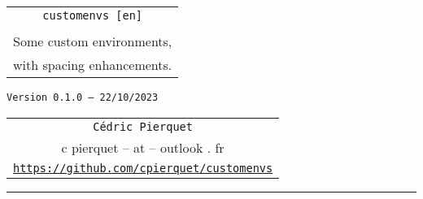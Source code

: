 \documentclass[english,11pt,a4paper]{article}
\def\TPversion{0.1.0}
\def\TPdate{22/10/2023}
\begin{document}
\pagestyle{fancy}

\thispagestyle{empty}

\begin{center}
	\begin{minipage}{0.75\linewidth}
	\begin{tcolorbox}[colframe=yellow,colback=yellow!15]
		\begin{center}
			\renewcommand\arraystretch{1.25}
			\begin{tabular}{c}
				{\Huge \texttt{customenvs [en]}}\\
				\\
				{\Large Some custom environments,} \\
				{\Large with spacing enhancements.} \\
			\end{tabular}
			\renewcommand\arraystretch{1}
			
			\medskip
			
			{\small \texttt{Version \TPversion{} -- \TPdate}}
		\end{center}
	\end{tcolorbox}
\end{minipage}
\end{center}

\vspace*{1mm}

\begin{center}
	\begin{tabular}{c}
	\texttt{Cédric Pierquet}\\
	{\ttfamily c pierquet -- at -- outlook . fr}\\
	\texttt{\url{https://github.com/cpierquet/customenvs}}
\end{tabular}
\end{center}

\vspace*{5mm}

%
%
%
%
%

\hrule


\hypertarget{matoc}{}

\tableofcontents

\vspace*{5mm}
\end{document}
